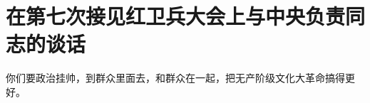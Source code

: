 \section[在第七次接见红卫兵大会上与中央负责同志的谈话（一九六六年十一月十日）]{在第七次接见红卫兵大会上与中央负责同志的谈话}


你们要政治挂帅，到群众里面去，和群众在一起，把无产阶级文化大革命搞得更好。


